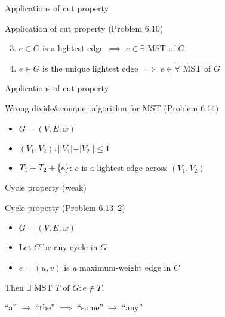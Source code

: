 \begin{frame}{Applications of cut property}
  \begin{exampleblock}{Application of cut property (Problem 6.10)}
	\begin{enumerate}[(1)]
	  \setcounter{enumi}{2}
	  \item $e \in G$ is a lightest edge $\implies$ $e \in \exists$ MST of $G$
	  \item $e \in G$ is the unique lightest edge $\implies$ $e \in \forall$ MST of $G$
	\end{enumerate}
  \end{exampleblock}
\end{frame}
\begin{frame}{Applications of cut property}
  \begin{exampleblock}{Wrong divide\&conquer algorithm for MST (Problem 6.14)}
    \begin{itemize}
      \item $G = (V, E, w)$
      \item $(V_{1}, V_{2}): ||V_{1}| - |V_{2}|| \le 1$
      \item $T_{1} + T_{2} + \{e\}$: $e$ is a lightest edge across $(V_{1}, V_{2})$
    \end{itemize}
  \end{exampleblock}

\end{frame}
\begin{frame}{Cycle property (weak)}
  \begin{exampleblock}{Cycle property (Problem 6.13--2)}
	\begin{itemize}
	  \item $G = (V,E,w)$
	  \item Let $C$ be any cycle in $G$
	  \item $e = (u,v)$ is \emph{a} maximum-weight edge in $C$
	\end{itemize}
	Then $\exists \textrm{ MST } T \text{ of } G: e \notin T$.
  \end{exampleblock}

  \begin{center}
	``a'' $\to$ ``the'' $\implies$ ``some'' $\to$ ``any''
  \end{center}
\end{frame}
